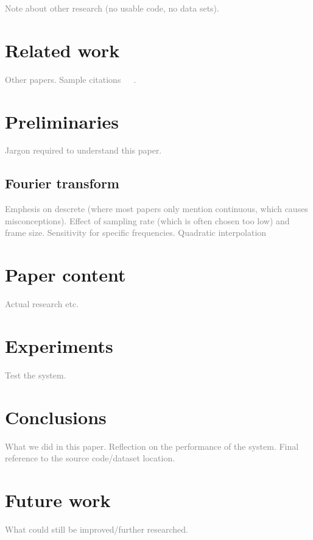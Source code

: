 \documentclass[10pt,twocolumn]{article}
\begin{document}
\textcolor{gray}{Note about other research (no usable code, no data sets).}


\section{Related work}
\textcolor{gray}{Other papers. Sample citations~\cite{mono}~\cite{window}~\cite{twotimes}.}


\section{Preliminaries}
\textcolor{gray}{Jargon required to understand this paper.}

\subsection{Fourier transform}
\textcolor{gray}{Emphesis on descrete (where most papers only mention continuous, which causes misconceptions). Effect of sampling rate (which is often chosen too low) and frame size. Sensitivity for specific frequencies. Quadratic interpolation}


\section{Paper content}
\textcolor{gray}{Actual research etc.}


\section{Experiments}  \label{sec:exp}
\textcolor{gray}{Test the system.}


\section{Conclusions}
\textcolor{gray}{What we did in this paper. Reflection on the performance of the system. Final reference to the source code/dataset location.}


\section{Future work}  \label{sec:future}
\textcolor{gray}{What could still be improved/further researched.}





\end{document}
